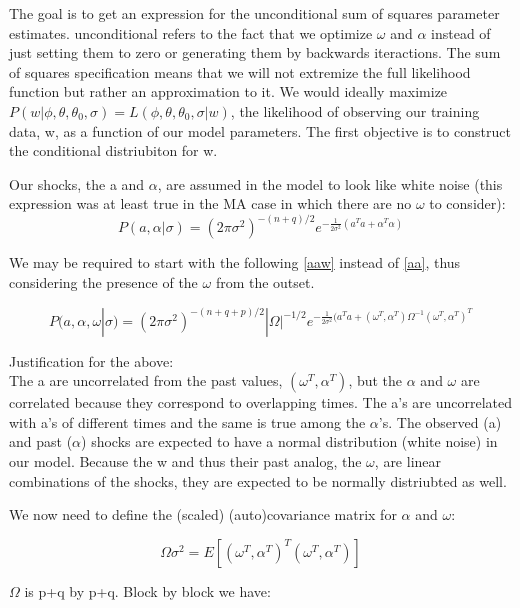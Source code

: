 \documentclass[8pt]{article}
\begin{document}
The goal is to get an expression for the unconditional sum of squares parameter estimates.
unconditional refers to the fact that we optimize $\omega$ and $\alpha$ instead of just setting them to zero or generating them by backwards iteractions. The sum of squares specification means that we will not extremize the full likelihood function but rather an approximation to it.
We would ideally maximize $P(w|\phi,\theta,\theta_0,\sigma) = L(\phi,\theta,\theta_0,\sigma|w)$, the likelihood of observing our training data, w, as a function of our model parameters. The first objective is to construct the conditional distriubiton for w.

Our shocks, the a and $\alpha$, are assumed in the model to  look like white noise (this expression was at least true in the MA case in which there are no $\omega$ to consider):
\begin{equation} \label{aa}
P(a,\alpha|\sigma) = (2\pi \sigma^2)^{-(n+q)/2} e^{-\frac{1}{2\sigma^2}(a^T a + \alpha^T \alpha)}
\end{equation}

We may be required to start with the following \ref{aaw} instead of \ref{aa}, thus considering the presence of the $\omega$ from the outset. 

\begin{equation} \label{aaw}
P(a,\alpha,\omega|\sigma) = (2\pi \sigma^2)^{-(n+q+p)/2}|\Omega|^{-1/2} e^{-\frac{1}{2\sigma^2}(a^T a +  (\omega^T,\alpha^T) \Omega^{-1} (\omega^T,\alpha^T)^T}
\end{equation}

Justification for the above:\\
The a are uncorrelated from the past values, $(\omega^T,\alpha^T)$, but the $\alpha$ and $\omega$ are correlated because they correspond to overlapping times. 
The a's are uncorrelated with a's of different times and the same is true among the $\alpha$'s.
The observed (a) and past ($\alpha$) shocks are expected to have a normal distribution (white noise) in our model. Because the w and thus their past analog, the $\omega$, are linear combinations of the shocks, they are expected to be normally distriubted as well. 

We now need to define the (scaled) (auto)covariance matrix for $\alpha$ and $\omega$:

\begin{equation}
\Omega \sigma^2 = E[(\omega^T,\alpha^T)^T (\omega^T,\alpha^T)] 
\end{equation}

$\Omega$ is p+q by p+q. Block by block we have:
\end{document}
